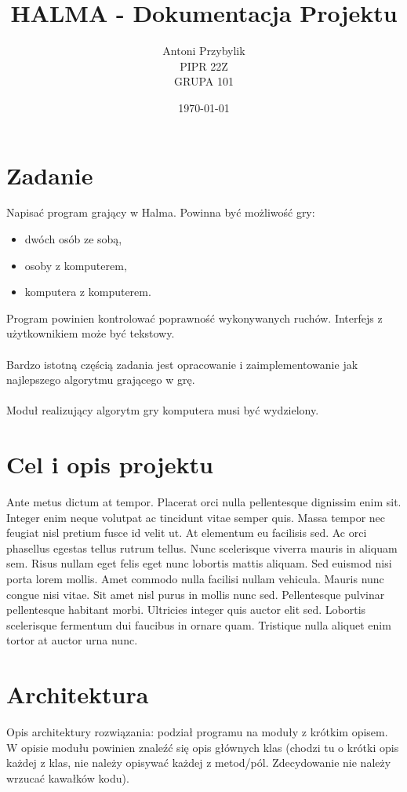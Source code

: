 \documentclass[12pt, titlepage]{article}
\author{Antoni Przybylik\\ PIPR 22Z\\ GRUPA 101}
\date{\today}
\title{HALMA - Dokumentacja Projektu}
\begin{document}
\maketitle
\justifying

\section{Zadanie}
Napisać program grający w Halma. Powinna być możliwość gry:

\begin{itemize}
\item dwóch osób ze sobą,
\item osoby z komputerem,
\item komputera z komputerem.
\end{itemize}

\noindent
Program powinien kontrolować poprawność wykonywanych ruchów. Interfejs z użytkownikiem może być tekstowy.
\\~\\
Bardzo istotną częścią zadania jest opracowanie i zaimplementowanie jak najlepszego algorytmu grającego w grę.
\\~\\
Moduł realizujący algorytm gry komputera musi być wydzielony.

\section{Cel i opis projektu}
Ante metus dictum at tempor. Placerat orci nulla pellentesque dignissim enim sit. Integer enim neque volutpat ac tincidunt vitae semper quis. Massa tempor nec feugiat nisl pretium fusce id velit ut. At elementum eu facilisis sed. Ac orci phasellus egestas tellus rutrum tellus. Nunc scelerisque viverra mauris in aliquam sem. Risus nullam eget felis eget nunc lobortis mattis aliquam. Sed euismod nisi porta lorem mollis. Amet commodo nulla facilisi nullam vehicula. Mauris nunc congue nisi vitae. Sit amet nisl purus in mollis nunc sed. Pellentesque pulvinar pellentesque habitant morbi. Ultricies integer quis auctor elit sed. Lobortis scelerisque fermentum dui faucibus in ornare quam. Tristique nulla aliquet enim tortor at auctor urna nunc.

\section{Architektura}
Opis architektury rozwiązania: podział programu na moduły z krótkim opisem. W opisie modułu powinien znaleźć się opis głównych klas (chodzi tu o krótki opis każdej z klas, nie należy opisywać każdej z metod/pól. Zdecydowanie nie należy wrzucać kawałków kodu).
\end{document}
